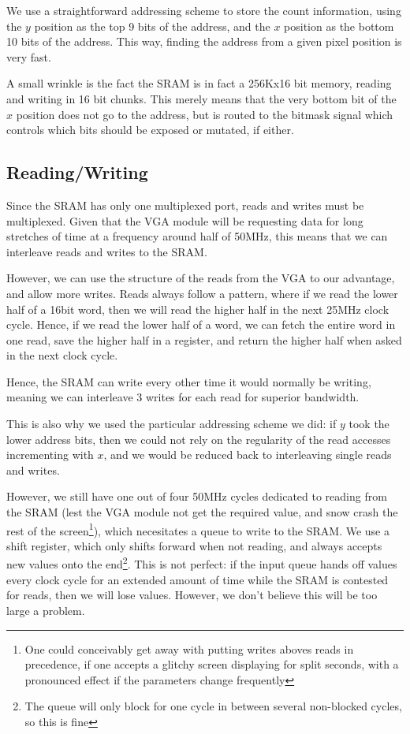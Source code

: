 \documentclass{article}
\begin{document}
We use a straightforward addressing scheme to store the count
information, using the $y$ position as the top 9 bits of the address,
and the $x$ position as the bottom 10 bits of the address. This way,
finding the address from a given pixel position is very fast.

A small wrinkle is the fact the SRAM is in fact a 256Kx16 bit memory,
reading and writing in 16 bit chunks. This merely means that the very
bottom bit of the $x$ position does not go to the address, but is
routed to the bitmask signal which controls which bits should be
exposed or mutated, if either.

\subsection{Reading/Writing}

Since the SRAM has only one multiplexed port, reads and writes must be
multiplexed. Given that the VGA module will be requesting data for
long stretches of time at a frequency around half of 50MHz, this means
that we can interleave reads and writes to the SRAM.

However, we can use the structure of the reads from the VGA to our
advantage, and allow more writes. Reads always follow a pattern, where
if we read the lower half of a 16bit word, then we will read the
higher half in the next 25MHz clock cycle. Hence, if we read the lower
half of a word, we can fetch the entire word in one read, save the
higher half in a register, and return the higher half when asked in
the next clock cycle.

Hence, the SRAM can write every other time it would normally be
writing, meaning we can interleave 3 writes for each read for superior
bandwidth.

This is also why we used the particular addressing scheme we did: if
$y$ took the lower address bits, then we could not rely on the
regularity of the read accesses incrementing with $x$, and we would be
reduced back to interleaving single reads and writes.

However, we still have one out of four 50MHz cycles dedicated to
reading from the SRAM (lest the VGA module not get the required value,
and snow crash the rest of the screen\footnote{One could conceivably
  get away with putting writes aboves reads in precedence, if one
  accepts a glitchy screen displaying for split seconds, with a
  pronounced effect if the parameters change frequently}), which
necesitates a queue to write to the SRAM. We use a shift register,
which only shifts forward when not reading, and always accepts new
values onto the end\footnote{The queue will only block for one cycle
  in between several non-blocked cycles, so this is fine}. This is not
perfect: if the input queue hands off values every clock cycle for an
extended amount of time while the SRAM is contested for reads, then we
will lose values. However, we don't believe this will be too large a
problem.
\end{document}
